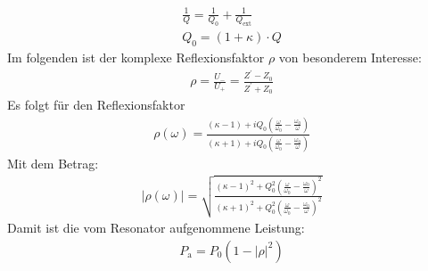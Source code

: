 \documentclass[11pt, a4paper]{scrbook}
\begin{document}
	\begin{align}
		\frac{1}{Q} = \frac{1}{Q_0} + \frac{1}{Q_\mathrm{ext}} \\
		Q_0 = (1 + \kappa) \cdot Q
	\end{align}
	Im folgenden ist der komplexe Reflexionsfaktor $\rho$ von besonderem Interesse:
	\begin{align}
		\rho = \frac{U_{-}}{U_{+}} = \frac{Z^\prime - Z_0}{Z^\prime + Z_0}
	\end{align}
	Es folgt für den Reflexionsfaktor
	\begin{align}
		\rho(\omega) = \frac{(\kappa - 1) + i  Q_0 \left( \frac{\omega}{\omega_0}  - \frac{\omega_0}{\omega}\right)}{\left( \kappa + 1 \right) + i  Q_0 \left( \frac{\omega}{\omega_0}  - \frac{\omega_0}{\omega}\right)}
	\end{align}
	Mit dem Betrag:
	\begin{align}
		| \rho(\omega) | = \sqrt{\frac{(\kappa - 1)^2 + Q_0^2 \left( \frac{\omega}{\omega_0}  - \frac{\omega_0}{\omega}\right)^2}{(\kappa + 1)^2 + Q_0^2 \left( \frac{\omega}{\omega_0}  - \frac{\omega_0}{\omega}\right)^2}}
	\end{align}
	Damit ist die vom Resonator aufgenommene Leistung:
	\begin{align}
		P_\mathrm{a} = P_0 (1- |\rho|^2)
	\end{align}
\end{document}
